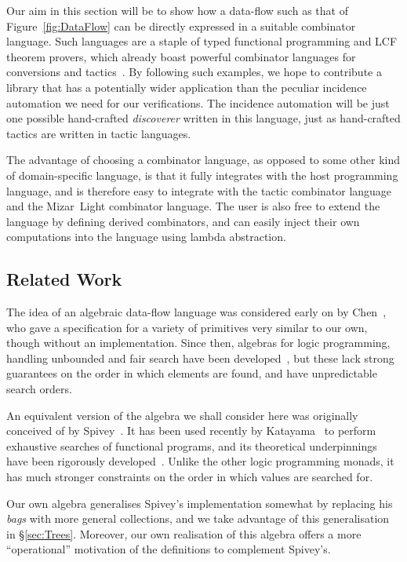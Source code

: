 Our aim in this section will be to show how a data-flow such as that of Figure~\ref{fig:DataFlow} can be directly expressed in a suitable combinator language. Such languages are a staple of typed functional programming and LCF theorem provers, which already boast powerful combinator languages for conversions and tactics~\cite{Tactics}. By following such examples, we hope to contribute a library that has a potentially wider application than the peculiar incidence automation we need for our verifications. The incidence automation will be just one possible hand-crafted \emph{discoverer} written in this language, just as hand-crafted tactics are written in tactic languages.

The advantage of choosing a combinator language, as opposed to some other kind of domain-specific language, is that it fully integrates with the host programming language, and is therefore easy to integrate with the tactic combinator language and the Mizar~Light combinator language. The user is also free to extend the language by defining derived combinators, and can easily inject their own computations into the language using lambda abstraction.

\subsection{Related Work}
The idea of an algebraic data-flow language was considered early on by Chen~\cite{ChenForwardChaining}, who gave a specification for a variety of primitives very similar to our own, though without an implementation. Since then, algebras for logic programming, handling unbounded and fair search have been developed~\cite{BacktrackingMonad,Omega}, but these lack strong guarantees on the order in which elements are found, and have unpredictable search orders.

An equivalent version of the algebra we shall consider here was originally conceived of by Spivey~\cite{SpiveyBreadthFirst}. It has been used recently by Katayama~\cite{ImprovementsMagickHaskeller} to perform exhaustive searches of functional programs, and its theoretical underpinnings have been rigorously developed~\cite{SearchAlgebras}. Unlike the other logic programming monads, it has much stronger constraints on the order in which values are searched for. 

Our own algebra generalises Spivey's implementation somewhat by replacing his \emph{bags} with more general collections, and we take advantage of this generalisation in \S\ref{sec:Trees}. Moreover, our own realisation of this algebra offers a more ``operational'' motivation of the definitions to complement Spivey's.

